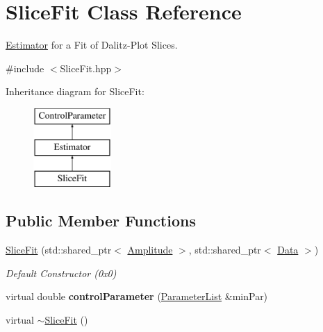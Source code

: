 \hypertarget{class_slice_fit}{\section{Slice\-Fit Class Reference}
\label{class_slice_fit}
}


\hyperlink{class_estimator}{Estimator} for a Fit of Dalitz-\/\-Plot Slices.  




{\ttfamily \#include $<$Slice\-Fit.\-hpp$>$}

Inheritance diagram for Slice\-Fit\-:\begin{figure}[H]
\begin{center}
\leavevmode
\includegraphics[height=3.000000cm]{class_slice_fit}
\end{center}
\end{figure}
\subsection*{Public Member Functions}
\begin{DoxyCompactItemize}
\item 
\hypertarget{class_slice_fit_abd46843e781866452d7587ad749d93d9}{\hyperlink{class_slice_fit_abd46843e781866452d7587ad749d93d9}{Slice\-Fit} (std\-::shared\-\_\-ptr$<$ \hyperlink{class_amplitude}{Amplitude} $>$, std\-::shared\-\_\-ptr$<$ \hyperlink{class_data}{Data} $>$)}\label{class_slice_fit_abd46843e781866452d7587ad749d93d9}

\begin{DoxyCompactList}\small\item\em Default Constructor (0x0) \end{DoxyCompactList}\item 
\hypertarget{class_slice_fit_a5fff370ea9a59ee149dba16c9e52e00d}{virtual double {\bfseries control\-Parameter} (\hyperlink{class_parameter_list}{Parameter\-List} \&min\-Par)}\label{class_slice_fit_a5fff370ea9a59ee149dba16c9e52e00d}

\item 
virtual \hyperlink{class_slice_fit_ab18be8542cbedb8c8c48b25badac3cb2}{$\sim$\-Slice\-Fit} ()
\end{DoxyCompactItemize}
